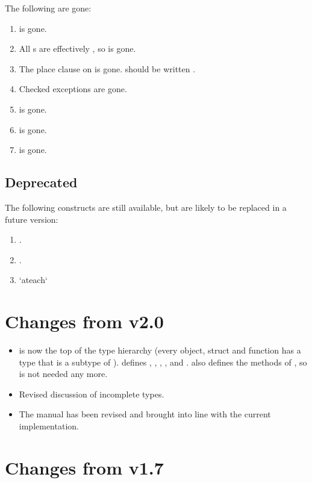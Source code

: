 The following are gone: 

\begin{enumerate}
\item {} is gone.
\item All s are effectively , so  is gone.
\item The place clause on  is gone.   should be
      written .
\item Checked exceptions are gone.
\item {} is gone.
\item {} is gone.
\item {} is gone.

\end{enumerate}

\subsection{Deprecated}

The following constructs are still available, but are likely to be replaced in
a future version: 


\begin{enumerate}
\item {}.
\item {}.
\item \xcd`ateach`
\end{enumerate}

\section{Changes from \Xten{} v2.0}

\begin{itemize}
\item {} is now the top of the type hierarchy (every object,
  struct and function has a type that is a subtype of
  ).  defines , , ,
  ,  and .  also defines the methods
  of , so  is not needed any more.
\item Revised discussion of incomplete types.
\item The manual has been revised and brought into line with the current implementation. 
\end{itemize}
\section{Changes from \Xten{} v1.7}

